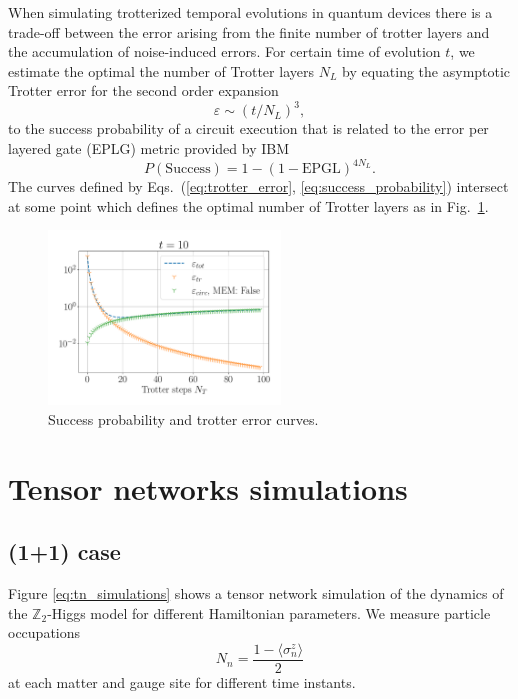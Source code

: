 \documentclass[a4paper]{article}
\begin{document}
When simulating trotterized temporal evolutions in quantum devices there is a trade-off between the error arising from the finite number of trotter layers and the accumulation of noise-induced errors. For certain time of evolution $t$, we estimate the optimal the number of Trotter layers $N_L$ by equating the asymptotic Trotter error for the second order expansion
%
\begin{equation}
    \varepsilon \sim (t/N_L)^3,
    \label{eq:trotter_error}
\end{equation}
%
to the success probability of a circuit execution that is related to the error per layered gate (EPLG) metric provided by IBM \cite{mckay2023benchmarkingquantumprocessorperformance}
%
\begin{equation}
    P(\mathrm{Success}) = 1 - (1-\text{EPGL})^{4 N_L}.
    \label{eq:success_probability}
\end{equation}
%
The curves defined by Eqs.~(\ref{eq:trotter_error}, \ref{eq:success_probability}) intersect at some point which defines the optimal number of Trotter layers as in Fig.~\ref{fig:optimal_layers}.

\begin{figure}
    \centering
    \includegraphics[width=0.55\textwidth]{optimal_trotter.pdf}
    \caption{Success probability and trotter error curves.}
    \label{fig:optimal_layers}
\end{figure}

\section{Tensor networks simulations}

\subsection{(1+1) case}

Figure \ref{eq:tn_simulations} shows a tensor network simulation of the dynamics of the $\mathbb{Z}_2$-Higgs model for different Hamiltonian parameters. We measure particle occupations 
%
\begin{equation}
    N_n = \frac{1 - \langle \sigma_n^z \rangle}{2}
\end{equation}
%
at each matter and gauge site for different time instants.
\end{document}
